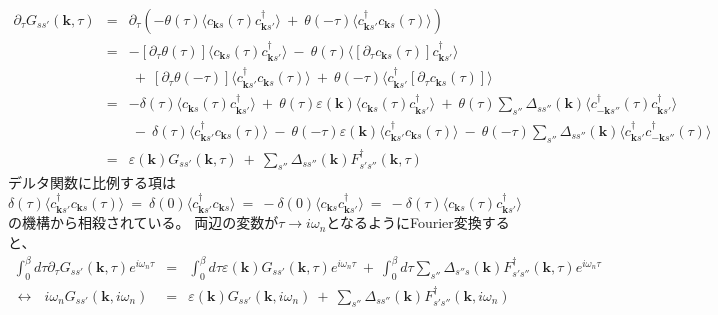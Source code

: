 \documentclass[a4j]{jsarticle}
\begin{document}
\begin{eqnarray}
	\partial_{\tau} G_{ss'}(\bm{k} , \tau)
	&=&
	\partial_{\tau}
	\left(
	-
	\theta(\tau)
	\langle c_{\bm{k}s}(\tau) c_{\bm{k} s'}^{\dagger} \rangle
	\ + \
	\theta(- \tau)
	\langle c_{\bm{k} s'}^{\dagger} c_{\bm{k}s}(\tau) \rangle
	\right)
	\nonumber \\[4mm] &=&
	-
	[\partial_{\tau} \theta(\tau) ]
	\langle c_{\bm{k}s}(\tau) c_{\bm{k} s'}^{\dagger} \rangle
	\ - \
	\theta(\tau)
	\langle
	[
		\partial_{\tau}
		c_{\bm{k}s}(\tau)
	]
	c_{\bm{k} s'}^{\dagger} \rangle
	\nonumber \\[2mm] &&
	\ + \
	[\partial_{\tau} \theta(- \tau) ]
	\langle c_{\bm{k} s'}^{\dagger} c_{\bm{k}s}(\tau) \rangle
	\ + \
	\theta(- \tau)
	\langle c_{\bm{k} s'}^{\dagger}
		[
			\partial_{\tau}
			c_{\bm{k}s}(\tau)
		]
	\rangle
	\nonumber \\[4mm] &=&
	-
	\delta(\tau)
	\langle c_{\bm{k}s}(\tau) c_{\bm{k} s'}^{\dagger} \rangle
	\ + \
	\theta(\tau)
	\varepsilon( \bm{k} )
	\langle
	c_{\bm{k} s} (\tau)
	c_{\bm{k} s'}^{\dagger}
	\rangle
	\ + \
	\theta(\tau)
	\sum_{ s'' }
	\Delta_{ s s'' }( \bm{k} )
	\langle
	c_{ - \bm{k} s''}^{\dagger}(\tau)
	c_{\bm{k} s'}^{\dagger}
	\rangle
	\nonumber \\[2mm] &&
	\ - \
	\delta ( \tau )
	\langle c_{\bm{k} s'}^{\dagger} c_{\bm{k}s}(\tau) \rangle
	\ - \
	\theta(- \tau)
	\varepsilon( \bm{k} )
	\langle
	c_{\bm{k} s'}^{\dagger}
	c_{\bm{k} s} (\tau)
	\rangle
	\ - \
	\theta(-\tau)
	\sum_{ s'' }
	\Delta_{ s s'' }( \bm{k} )
	\langle
	c_{\bm{k} s'}^{\dagger}
	c_{ - \bm{k} s''}^{\dagger}(\tau)
	\rangle
	\nonumber \\[2mm] &=&
	\varepsilon( \bm{k} )
	G_{ss'}(\bm{k} , \tau)
	\ + \
	\sum_{s''}
	\Delta_{ s s'' }( \bm{k} )
	F_{ s' s'' }^{\dagger} ( \bm{k} , \tau)
\end{eqnarray}
%
%
%
%
デルタ関数に比例する項は
$$
	\delta ( \tau )
	\langle c_{\bm{k} s'}^{\dagger} c_{\bm{k}s}(\tau) \rangle
	\ = \
	\delta ( 0 )
	\langle c_{\bm{k} s'}^{\dagger} c_{\bm{k}s} \rangle
	\ = \
	-
	\delta ( 0 )
	\langle c_{\bm{k}s} c_{\bm{k} s'}^{\dagger} \rangle
	\ = \
	-
	\delta ( \tau )
	\langle c_{\bm{k}s}(\tau) c_{\bm{k} s'}^{\dagger} \rangle
$$
の機構から相殺されている。
両辺の変数が$\tau \to i \omega_{n}$となるようにFourier変換すると、
%
%
%
%
\begin{eqnarray}
	\int^{\beta}_{0} d \tau
	\partial_{\tau}
	G_{ss'}(\bm{k} , \tau)
	e^{i \omega_{n} \tau}
	&=&
	\int^{\beta}_{0} d \tau
	\varepsilon( \bm{k} )
	G_{ss'}(\bm{k} , \tau)
	e^{i \omega_{n} \tau}
	\ + \
	\int^{\beta}_{0} d \tau
	\sum_{s''}
	\Delta_{ s'' s }( \bm{k} )
	F_{ s' s'' }^{\dagger} ( \bm{k} , \tau)
	e^{i \omega_{n} \tau}
	\nonumber \\[2mm]
	\longleftrightarrow \ \ \
	i \omega_{n}
	G_{ss'}(\bm{k} , i \omega_{n} )
	&=&
	\varepsilon( \bm{k} )
	G_{ss'}(\bm{k} , i \omega_{n} )
	\ + \
	\sum_{s''}
	\Delta_{ s s'' }( \bm{k} )
	F_{ s' s'' }^{\dagger} ( \bm{k} , i \omega_{n} )
\end{eqnarray}
\end{document}
